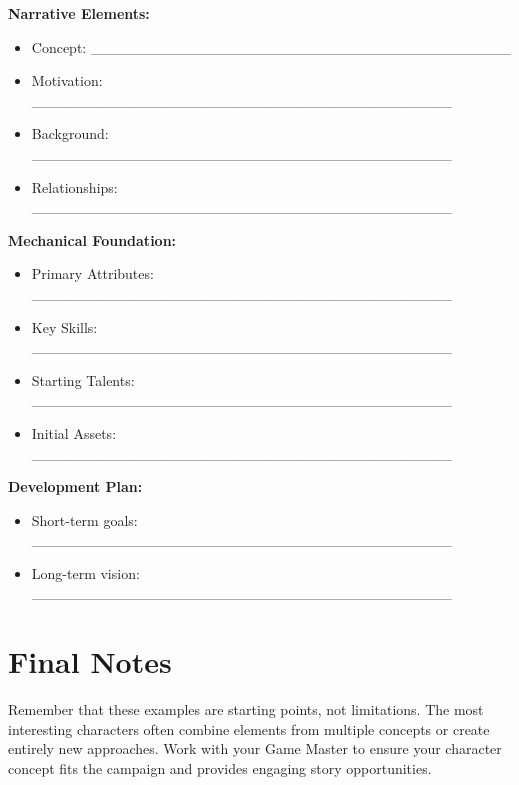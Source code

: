 \documentclass[11pt,twoside,openany]{book}
\begin{document}
\begin{tcolorbox}[colback=gray!5!white, colframe=gray!75!black, title=Character Concept Worksheet, fonttitle=\bfseries]
\textbf{Narrative Elements:}
\begin{itemize}
\item Concept: \_\_\_\_\_\_\_\_\_\_\_\_\_\_\_\_\_\_\_\_\_\_\_\_\_\_\_\_\_\_\_\_\_\_\_\_\_\_\_\_
\item Motivation: \_\_\_\_\_\_\_\_\_\_\_\_\_\_\_\_\_\_\_\_\_\_\_\_\_\_\_\_\_\_\_\_\_\_\_\_\_\_\_\_
\item Background: \_\_\_\_\_\_\_\_\_\_\_\_\_\_\_\_\_\_\_\_\_\_\_\_\_\_\_\_\_\_\_\_\_\_\_\_\_\_\_\_
\item Relationships: \_\_\_\_\_\_\_\_\_\_\_\_\_\_\_\_\_\_\_\_\_\_\_\_\_\_\_\_\_\_\_\_\_\_\_\_\_\_\_\_
\end{itemize}

\textbf{Mechanical Foundation:}
\begin{itemize}
\item Primary Attributes: \_\_\_\_\_\_\_\_\_\_\_\_\_\_\_\_\_\_\_\_\_\_\_\_\_\_\_\_\_\_\_\_\_\_\_\_\_\_\_\_
\item Key Skills: \_\_\_\_\_\_\_\_\_\_\_\_\_\_\_\_\_\_\_\_\_\_\_\_\_\_\_\_\_\_\_\_\_\_\_\_\_\_\_\_
\item Starting Talents: \_\_\_\_\_\_\_\_\_\_\_\_\_\_\_\_\_\_\_\_\_\_\_\_\_\_\_\_\_\_\_\_\_\_\_\_\_\_\_\_
\item Initial Assets: \_\_\_\_\_\_\_\_\_\_\_\_\_\_\_\_\_\_\_\_\_\_\_\_\_\_\_\_\_\_\_\_\_\_\_\_\_\_\_\_
\end{itemize}

\textbf{Development Plan:}
\begin{itemize}
\item Short-term goals: \_\_\_\_\_\_\_\_\_\_\_\_\_\_\_\_\_\_\_\_\_\_\_\_\_\_\_\_\_\_\_\_\_\_\_\_\_\_\_\_
\item Long-term vision: \_\_\_\_\_\_\_\_\_\_\_\_\_\_\_\_\_\_\_\_\_\_\_\_\_\_\_\_\_\_\_\_\_\_\_\_\_\_\_\_
\end{itemize}
\end{tcolorbox}

\section*{Final Notes} 

Remember that these examples are starting points, not limitations. The most interesting characters often combine elements from multiple concepts or create entirely new approaches. Work with your Game Master to ensure your character concept fits the campaign and provides engaging story opportunities.
\end{document}
